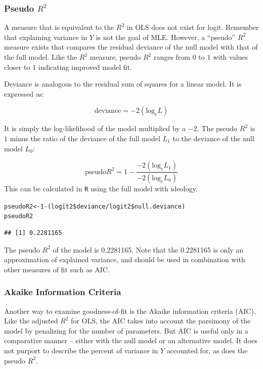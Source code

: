 \documentclass[11pt,openany]{book}\usepackage[]{graphicx}\usepackage[]{color}
\makeatletter
\newcommand{\hlnum}[1]{\textcolor[rgb]{0.686,0.059,0.569}{#1}}%
\newcommand{\hlopt}[1]{\textcolor[rgb]{0,0,0}{#1}}%
\newcommand{\hlstd}[1]{\textcolor[rgb]{0.345,0.345,0.345}{#1}}%
\newcommand{\hlkwb}[1]{\textcolor[rgb]{0.69,0.353,0.396}{#1}}%
\newenvironment{kframe}{%
 \def\at@end@of@kframe{}%
 \ifinner\ifhmode%
  \def\at@end@of@kframe{\end{minipage}}%
  \begin{minipage}{\columnwidth}%
 \fi\fi%
 \def\FrameCommand##1{\hskip\@totalleftmargin \hskip-\fboxsep
 \colorbox{shadecolor}{##1}\hskip-\fboxsep
     \hskip-\linewidth \hskip-\@totalleftmargin \hskip\columnwidth}%
 \MakeFramed {\advance\hsize-\width
   \@totalleftmargin\z@ \linewidth\hsize
   \@setminipage}}%
 {\par\unskip\endMakeFramed%
 \at@end@of@kframe}
\newenvironment{knitrout}{}{} %
\renewenvironment{knitrout}{\begin{singlespace}}{\end{singlespace}}
\makeatother
\begin{document}
\subsubsection{Pseudo $R^2$}

A measure that is equivalent to the $R^2$ in OLS does not exist for logit. Remember that explaining variance in $Y$ is not the goal of MLE. However, a ``pseudo'' $R^2$ measure exists that compares the residual deviance of the null model with that of the  full model. Like the $R^2$ measure, pseudo $R^2$ ranges from $0$ to $1$ with values closer to $1$ indicating improved model fit. 

Deviance is analogous to the residual sum of squares for a linear model. It is expressed as:

\begin{equation}
  \label{eq:dev}
  \text{deviance} = -2(\text{log}_e L)
\end{equation}

\noindent It is simply the log-likelihood of the model multiplied by a $-2$. The pseudo $R^2$ is $1$ minus the ratio of the deviance of the full model $L_1$ to the deviance of the null model $L_0$:

\begin{equation}
  \label{eq:psR2}
  \text{pseudo} R^2 = 1-\frac{-2(\text{log}_e L_1)}{-2(\text{log}_e L_0)} 
\end{equation}
\noindent This can be calculated in \texttt{R} using the full
model with ideology. 
\begin{knitrout}
\color{fgcolor}\begin{kframe}
\begin{alltt}
\hlstd{pseudoR2} \hlkwb{<-} \hlnum{1} \hlopt{-} \hlstd{(logit2}\hlopt{\$}\hlstd{deviance}\hlopt{/}\hlstd{logit2}\hlopt{\$}\hlstd{null.deviance)}
\hlstd{pseudoR2}
\end{alltt}
\begin{verbatim}
## [1] 0.2281165
\end{verbatim}
\end{kframe}
\end{knitrout}
\noindent The pseudo $R^2$ of the model is 0.2281165. Note that the 0.2281165 is only an approximation of explained variance, and should be used in combination with other measures of fit such as AIC.

\subsubsection{Akaike Information Criteria}
Another way to examine goodness-of-fit is the Akaike information criteria (AIC). Like the adjusted $R^2$ for OLS, the AIC takes into account the parsimony of the model by penalizing for the number of parameters. But AIC is useful only in a comparative manner -- either with the null model or an alternative model. It does not purport to describe the percent of variance in $Y$ accounted for, as does the pseudo $R^2$.
\end{document}
